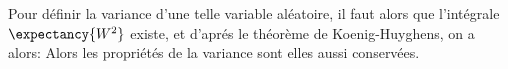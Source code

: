 Pour définir la variance d'une telle variable aléatoire, il faut alors que l'intégrale \(\expectancy{W^2}\) existe, et d'aprés le théorème de Koenig-Huyghens, on a alors: 
Alors les propriétés de la variance sont elles aussi conservées.